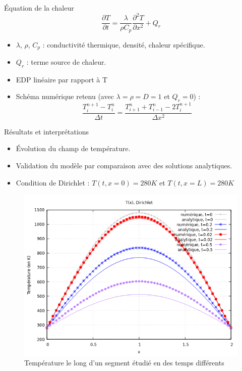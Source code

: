 \documentclass{beamer}
\begin{document}
\begin{frame}{Équation de la chaleur}
    \begin{equation}
        \frac{\partial T}{\partial t} =    \frac{\lambda}{ \rho C_p} \frac{\partial^2 T}{\partial x^2} + Q_r
    \end{equation}
    \begin{itemize}
        \item $\lambda$, $\rho$, $C_p$ : conductivité thermique, densité, chaleur spécifique.
        \item $Q_r$ : terme source de chaleur.
        \item EDP linéaire par rapport à T
        \item Schéma numérique retenu (avec $\lambda=\rho=D=1$ et $Q_r=0$) : 
        \begin{equation}
            \frac{T_i^{n+1}-T_i^n}{\Delta t}= \frac{T_{i+1}^n+T_{i-1}^n-2T_i^{n+1}}{\Delta x^2} 
        \end{equation}
    \end{itemize}
\end{frame}

\begin{frame}{Résultats et interprétations}
    \begin{itemize}
        \item Évolution du champ de température.
        \item Validation du modèle par comparaison avec des solutions analytiques.
        \item Condition de Dirichlet : $ T(t, x=0) = 280K$ et $T(t, x=L) = 280K$
    \end{itemize}
    \begin{figure}
        \centering
        \includegraphics[width=0.75\linewidth]{images/graphe_temperature_grid.png}
        \caption{Température le long d'un segment étudié en des temps différents}
    \end{figure}
\end{frame}
\end{document}
